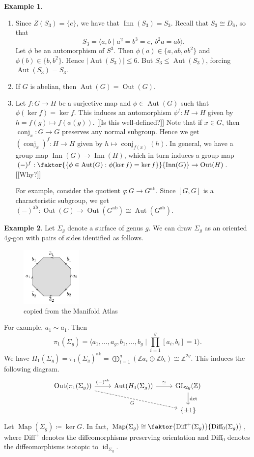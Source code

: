 \documentclass[10pt,letterpaper,cm]{nupset}
\theoremstyle{definition}
\newtheorem{exmp}{Example}
\newcommand{\Z}{\mathbb Z}
\newcommand{\1}{\mathbf{1}}
\newcommand{\0}{\vec 0}
\DeclareMathOperator*{\GL}{GL}
\DeclareMathOperator{\id}{id}
\DeclareMathOperator{\aut}{Aut}
\DeclareMathOperator{\inn}{Inn}
\DeclareMathOperator{\out}{Out}
\DeclareMathOperator{\ab}{ab}
\DeclareMathOperator{\conj}{conj}
\DeclareMathOperator{\map}{Map}
\begin{document}
\begin{exmp} $ $
\begin{enumerate}
\item Since $Z(S_3) =\{e\}$, we have that $\inn(S_3) = S_3$. Recall that $S_3 \cong D_6$, so that $$S_3 = \langle a, b \mid a^2 = b^3 = e,\ b^2a = ab\rangle.$$ Let $\phi$ be an automorphism of $S^3$. Then $\phi(a) \in \{a, ab, ab^2\}$ and $\phi(b) \in \{b, b^2\}$. Hence $|\aut(S_3)|\leq 6$. But $S_3 \leq \aut(S_3)$, forcing $\aut(S_3) = S_3$.
\item If $G$ is abelian, then $\aut(G)= \out(G)$.
\item Let $f: G \to H$ be a surjective map and $\phi \in \aut(G)$ such that $\phi(\ker f) = \ker f$. This induces an automorphism $\phi^f : H \to H$ given by $h = f(g) \mapsto f(\phi(g))$. {[[Is this well-defined?]]} Note that if $x\in G$, then $\conj_x: G \to G$ preserves any normal subgroup. Hence we get $(\conj_x)^f : H \to H$ given by $h\mapsto \conj_{f(x)}(h)$. In general, we have a group map $\inn(G) \to \inn(H)$, which in turn induces a group map $(-)^f: \faktor{\{\phi \in \aut(G) : \phi(\ker f)= \ker f\}}{\inn(G)} \to \out(H)$. {[[Why?]]}

For example, consider the quotient $q : G \to G^{\ab}$. Since $[G, G]$ is a characteristic subgroup, we get $(-)^{\ab} : \out(G) \to \out(G^{\ab})\cong \aut(G^{\ab})$.
\end{enumerate}
\end{exmp}

\begin{exmp}
Let $\Sigma_g$ denote a surface of genus $g$.
We can draw $\Sigma_g$ as an oriented  $4g$-gon with pairs of sides identified as follows.
\begin{figure}[H]
\centering
\includegraphics[width=30mm]{polygon-Sg.png}
\caption{copied from the Manifold Atlas} \label{overflow}
\end{figure} 
For example, $a_1 \sim \bar{a}_1$.  Then $$\pi_1(\Sigma_g) = \langle a_1, \ldots, a_g, b_1, \ldots, b_g \mid \prod_{i=1}^g [a_i, b_i] = 1 \rangle.$$ We have $H_1(\Sigma_g) = \pi_1(\Sigma_g)^{\ab} = \bigoplus_{i=1}^g (\Z a_i \oplus \Z b_i)\cong \Z^{2g}.$ This induces the following diagram.
\[
\begin{tikzcd}
\out(\pi_1(\Sigma_g)) \arrow[r, "(-)^{\ab}"] \arrow[rrd, "G"', dashed] & \aut(H_1(\Sigma_g)) \arrow[r, "\cong"] & \GL_{2g}(\Z) \arrow[d, "\det"] \\
 &  & \{\pm 1\}
\end{tikzcd}
\]
Let $\map(\Sigma_g) \coloneqq  \ker G$. In fact, $\map(\Sigma_g) \cong \faktor{\text{Diff}^+(\Sigma_g)}{\text{Diff}_0(\Sigma_g)}$, where $\text{Diff}^+$ denotes the diffeomorphisms preserving orientation and $\text{Diff}_0$ denotes the diffeomorphisms isotopic to $\id_{\Sigma_g}$.
\end{exmp}
\end{document}
